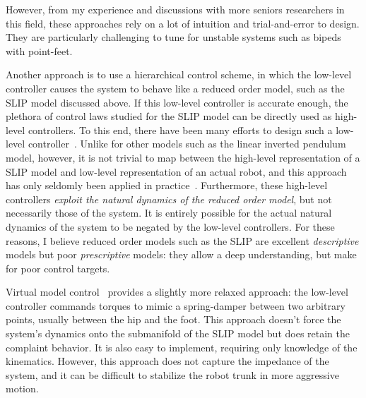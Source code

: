 However, from my experience and discussions with more seniors researchers in this field, these approaches rely on a lot of intuition and trial-and-error to design. They are particularly challenging to tune for unstable systems such as bipeds with point-feet. \par
Another approach is to use a hierarchical control scheme, in which the low-level controller causes the system to behave like a reduced order model, such as the SLIP model discussed above.
If this low-level controller is accurate enough, the plethora of control laws studied for the SLIP model can be directly used as high-level controllers. To this end, there have been many efforts to design such a low-level controller~\cite{hutter2010slip,poulakakis2009spring,wensing2013high}. Unlike for other models such as the linear inverted pendulum model, however, it is not trivial to map between the high-level representation of a SLIP model and low-level representation of an actual robot, and this approach has only seldomly been applied in practice~\cite{martin2017experimental}.
Furthermore, these high-level controllers \emph{exploit the natural dynamics of the reduced order model}, but not necessarily those of the system. It is entirely possible for the actual natural dynamics of the system to be negated by the low-level controllers.
For these reasons, I believe reduced order models such as the SLIP are excellent \emph{descriptive} models but poor \emph{prescriptive} models: they allow a deep understanding, but make for poor control targets. \par
Virtual model control~\cite{pratt2001virtual,renjewski2015exciting} provides a slightly more relaxed approach: the low-level controller commands torques to mimic a spring-damper between two arbitrary points, usually between the hip and the foot. This approach doesn't force the system's dynamics onto the submanifold of the SLIP model but does retain the complaint behavior. It is also easy to implement, requiring only knowledge of the kinematics. However, this approach does not capture the impedance of the system, and it can be difficult to stabilize the robot trunk in more aggressive motion.

